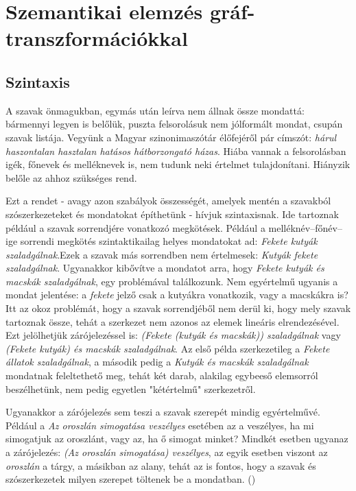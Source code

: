 \chapter{Szemantikai elemzés gráf-transzformációkkal}
\label{sec:spwgt}
\section{Szintaxis}
\label{sec:syntax}
A szavak önmagukban, egymás után leírva nem állnak össze mondattá: bármennyi legyen is belőlük, puszta felsorolásuk nem jólformált mondat, csupán szavak listája. Vegyünk a Magyar szinonimaszótár élőfejéről pár címszót: \textit{hárul haszontalan hasztalan hatásos hátborzongató házas}. Hiába vannak a felsorolásban igék, főnevek és melléknevek is, nem tudunk neki értelmet tulajdonítani. Hiányzik belőle az ahhoz szükséges rend.

Ezt a rendet - avagy azon szabályok összességét, amelyek mentén a szavakból szószerkezeteket és mondatokat építhetünk - hívjuk szintaxisnak. Ide tartoznak például a szavak sorrendjére vonatkozó megkötések.
Például a melléknév–főnév–ige sorrendi megkötés szintaktikailag helyes mondatokat ad: \textit{Fekete kutyák szaladgálnak}.Ezek a szavak más sorrendben nem értelmesek: \textit{Kutyák fekete szaladgálnak}. Ugyanakkor kibővítve a mondatot arra, hogy \textit{Fekete kutyák és macskák szaladgálnak}, egy problémával találkozunk. Nem egyértelmű ugyanis a mondat jelentése: a \textit{fekete} jelző csak a kutyákra vonatkozik, vagy a macskákra is?
Itt az okoz problémát, hogy a szavak sorrendjéből nem derül ki, hogy mely szavak tartoznak össze, tehát a szerkezet nem azonos az elemek lineáris elrendezésével.
Ezt jelölhetjük zárójelezéssel is: \textit{(Fekete (kutyák és macskák)) szaladgálnak} vagy \textit{(Fekete kutyák) és macskák szaladgálnak}. Az első példa szerkezetileg a \textit{Fekete állatok szaladgálnak}, a második pedig a \textit{Kutyák és macskák szaladgálnak} mondatnak feleltethető meg, tehát két darab, alakilag egybeeső elemsorról beszélhetünk, nem pedig egyetlen "kétértelmű" szerkezetről.

Ugyanakkor a zárójelezés sem teszi a szavak szerepét mindig egyértelművé. Például a \textit{Az oroszlán simogatása veszélyes} esetében az a veszélyes, ha mi simogatjuk az oroszlánt, vagy az, ha ő simogat minket? Mindkét esetben ugyanaz a zárójelezés: \textit{(Az oroszlán simogatása) veszélyes}, az egyik esetben viszont az \textit{oroszlán} a tárgy, a másikban az alany, tehát az is fontos, hogy a szavak és szószerkezetek milyen szerepet töltenek be a mondatban. (\cite{Kenesei:2004}) 

